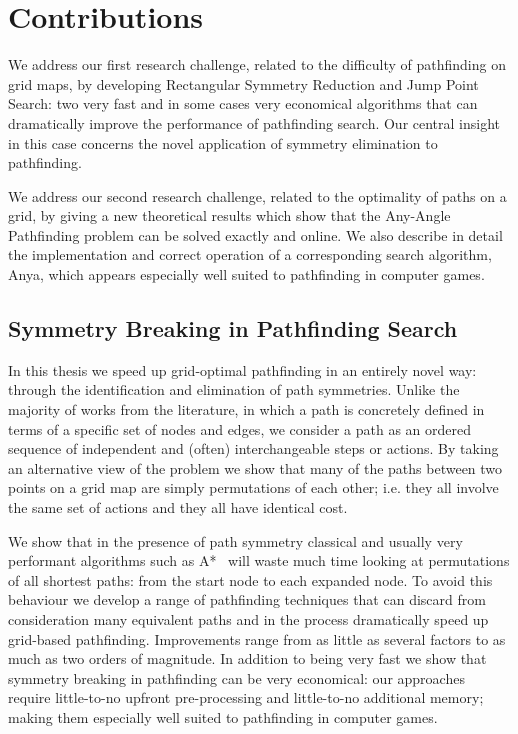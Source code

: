 \section{Contributions}
\label{cha::intro::contributions}
We address our first research challenge, related to the difficulty of
pathfinding on grid maps, by developing Rectangular Symmetry Reduction and
Jump Point Search: two very fast and in some cases very economical algorithms
that can dramatically improve the performance of pathfinding search.  Our
central insight in this case concerns the novel application of symmetry
elimination to pathfinding.

We address our second research challenge, related to the optimality of paths
on a grid, by giving a new theoretical results which show that the Any-Angle
Pathfinding problem can be solved exactly and online. We also describe in
detail the implementation and correct operation of a corresponding search
algorithm, Anya, which appears especially well suited to pathfinding in
computer games.

\subsection{Symmetry Breaking in Pathfinding Search}
In this thesis we speed up grid-optimal pathfinding in an entirely novel way:
through the identification and elimination of path symmetries.  Unlike the
majority of works from the literature, in which a path is concretely defined
in terms of a specific set of nodes and edges, we consider a path as an
ordered sequence of independent and (often) interchangeable steps or actions.
By taking an alternative view of the problem we show that many of the paths
between two points on a grid map are simply permutations of each other; i.e.
they all involve the same set of actions and they all have identical cost.

We show that in the presence of path symmetry classical and usually very
performant algorithms such as A{*}~\citep{hart68} will waste much time looking at
permutations of all shortest paths: from the start node to each expanded node.
To avoid this behaviour we develop a range of pathfinding techniques that can
discard from consideration many equivalent paths and in the process
dramatically speed up grid-based pathfinding.  Improvements range from as
little as several factors to as much as two orders of magnitude.  In addition
to being very fast we show that symmetry breaking in pathfinding can be very
economical: our approaches require little-to-no upfront pre-processing and
little-to-no additional memory; making them especially well suited to
pathfinding in computer games.

